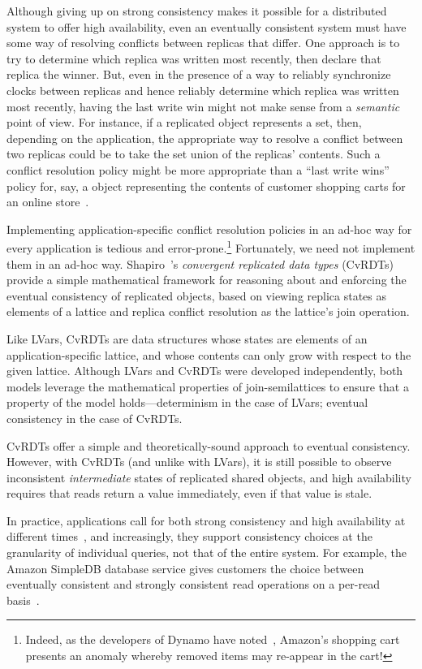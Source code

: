 Although giving up on strong consistency makes it possible for a
distributed system to offer high availability, even an eventually
consistent system must have some way of resolving conflicts between
replicas that differ.  One approach is to try to determine which
replica was written most recently, then declare that replica the
winner.  But, even in the presence of a way to reliably synchronize
clocks between replicas and hence reliably determine which replica was
written most recently, having the last write win might not make sense
from a \emph{semantic} point of view.  For instance, if a replicated
object represents a set, then, depending on the application, the
appropriate way to resolve a conflict between two replicas could be to
take the set union of the replicas' contents.  Such a conflict
resolution policy might be more appropriate than a ``last write wins''
policy for, say, a object representing the contents of customer
shopping carts for an online store~\cite{dynamo}.

Implementing application-specific conflict resolution policies in an
ad-hoc way for every application is tedious and
error-prone.\footnote{Indeed, as the developers of Dynamo have
  noted~\cite{dynamo}, Amazon's shopping cart presents an anomaly
  whereby removed items may re-appear in the cart!}  Fortunately, we
need not implement them in an ad-hoc way. Shapiro~\etal's
\emph{convergent replicated data types} (CvRDTs)~\cite{crdts,crdts-tr}
provide a simple mathematical framework for reasoning about and
enforcing the eventual consistency of replicated objects, based on
viewing replica states as elements of a lattice and replica conflict
resolution as the lattice's join operation.

Like LVars, CvRDTs are data structures whose states are elements of an
application-specific lattice, and whose contents can only grow with
respect to the given lattice.  Although LVars and CvRDTs were
developed independently, both models leverage the mathematical
properties of join-semilattices to ensure that a property of the model
holds---determinism in the case of LVars; eventual consistency in the
case of CvRDTs.  

CvRDTs offer a simple and theoretically-sound approach to eventual
consistency.  However, with CvRDTs (and unlike with LVars), it is
still possible to observe inconsistent \emph{intermediate} states of
replicated shared objects, and high availability requires that reads
return a value immediately, even if that value is stale.

In practice, applications call for both strong consistency and high
availability at different times~\cite{pileus}, and increasingly, they
support consistency choices at the granularity of individual queries,
not that of the entire system.  For example, the Amazon SimpleDB
database service gives customers the choice between eventually
consistent and strongly consistent read operations on a per-read
basis~\cite{simpledb-vogels-article}.

